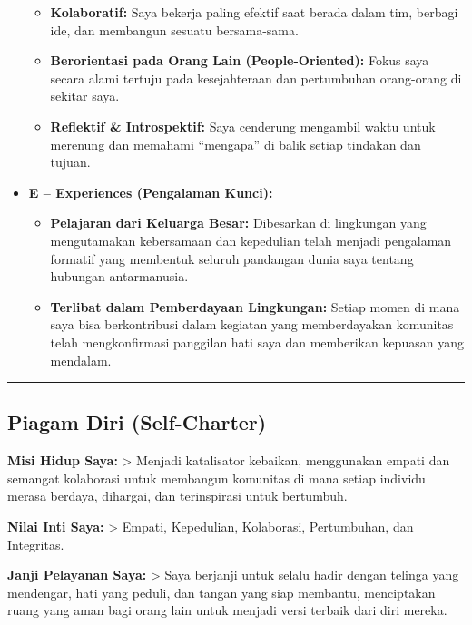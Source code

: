 \documentclass[
  letterpaper,
  DIV=11,
  numbers=noendperiod]{scrreprt}
\providecommand{\tightlist}{%
  \setlength{\itemsep}{0pt}\setlength{\parskip}{0pt}}
\begin{document}
\begin{itemize}
  \begin{itemize}
  \tightlist
  \item
    \textbf{Kolaboratif:} Saya bekerja paling efektif saat berada dalam
    tim, berbagi ide, dan membangun sesuatu bersama-sama.
  \item
    \textbf{Berorientasi pada Orang Lain (People-Oriented):} Fokus saya
    secara alami tertuju pada kesejahteraan dan pertumbuhan orang-orang
    di sekitar saya.
  \item
    \textbf{Reflektif \& Introspektif:} Saya cenderung mengambil waktu
    untuk merenung dan memahami ``mengapa'' di balik setiap tindakan dan
    tujuan.
  \end{itemize}
\item
  \textbf{E -- Experiences (Pengalaman Kunci):}

  \begin{itemize}
  \tightlist
  \item
    \textbf{Pelajaran dari Keluarga Besar:} Dibesarkan di lingkungan
    yang mengutamakan kebersamaan dan kepedulian telah menjadi
    pengalaman formatif yang membentuk seluruh pandangan dunia saya
    tentang hubungan antarmanusia.
  \item
    \textbf{Terlibat dalam Pemberdayaan Lingkungan:} Setiap momen di
    mana saya bisa berkontribusi dalam kegiatan yang memberdayakan
    komunitas telah mengkonfirmasi panggilan hati saya dan memberikan
    kepuasan yang mendalam.
  \end{itemize}
\end{itemize}

\begin{center}\rule{0.5\linewidth}{0.5pt}\end{center}

\subsection{Piagam Diri (Self-Charter)}\label{piagam-diri-self-charter}

\textbf{Misi Hidup Saya:} \textgreater{} Menjadi katalisator kebaikan,
menggunakan empati dan semangat kolaborasi untuk membangun komunitas di
mana setiap individu merasa berdaya, dihargai, dan terinspirasi untuk
bertumbuh.

\textbf{Nilai Inti Saya:} \textgreater{} Empati, Kepedulian, Kolaborasi,
Pertumbuhan, dan Integritas.

\textbf{Janji Pelayanan Saya:} \textgreater{} Saya berjanji untuk selalu
hadir dengan telinga yang mendengar, hati yang peduli, dan tangan yang
siap membantu, menciptakan ruang yang aman bagi orang lain untuk menjadi
versi terbaik dari diri mereka.
\end{document}
